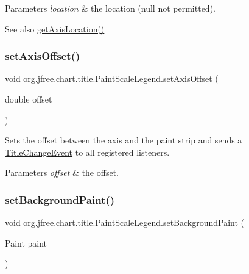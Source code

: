 \begin{DoxyParams}{Parameters}
{\em location} & the location ({\ttfamily null} not permitted).\\
\hline
\end{DoxyParams}
\begin{DoxySeeAlso}{See also}
\mbox{\hyperlink{classorg_1_1jfree_1_1chart_1_1title_1_1_paint_scale_legend_a20d245ad308c3f67e6fe3a41d1c66607}{get\+Axis\+Location()}} 
\end{DoxySeeAlso}
\mbox{\label{classorg_1_1jfree_1_1chart_1_1title_1_1_paint_scale_legend_aba46d6de1dca8b8adc85598dac3d93c0}} 
\subsubsection{\texorpdfstring{set\+Axis\+Offset()}{setAxisOffset()}}
{\footnotesize\ttfamily void org.\+jfree.\+chart.\+title.\+Paint\+Scale\+Legend.\+set\+Axis\+Offset (\begin{DoxyParamCaption}\item[{double}]{offset }\end{DoxyParamCaption})}

Sets the offset between the axis and the paint strip and sends a \mbox{\hyperlink{}{Title\+Change\+Event}} to all registered listeners.


\begin{DoxyParams}{Parameters}
{\em offset} & the offset. \\
\hline
\end{DoxyParams}
\mbox{\label{classorg_1_1jfree_1_1chart_1_1title_1_1_paint_scale_legend_a446bbca0729d3d555b6f5ae4b9d941fb}} 
\subsubsection{\texorpdfstring{set\+Background\+Paint()}{setBackgroundPaint()}}
{\footnotesize\ttfamily void org.\+jfree.\+chart.\+title.\+Paint\+Scale\+Legend.\+set\+Background\+Paint (\begin{DoxyParamCaption}\item[{Paint}]{paint }\end{DoxyParamCaption})}

